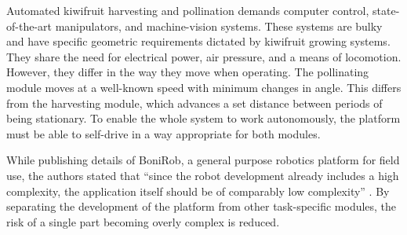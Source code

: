 \documentclass[preprint,authoryear,12pt]{elsarticle}
\begin{document}
    Automated kiwifruit harvesting and pollination demands computer control, state-of-the-art manipulators, and machine-vision systems.
    These systems are bulky and have specific geometric requirements dictated by kiwifruit growing systems.
    They share the need for electrical power, air pressure, and a means of locomotion.
    However, they differ in the way they move when operating.
    The pollinating module moves at a well-known speed with minimum changes in angle.
    This differs from the harvesting module, which advances a set distance between periods of being stationary.
    To enable the whole system to work autonomously, the platform must be able to self-drive in a way appropriate for both modules.

    While publishing details of BoniRob, a general purpose robotics platform for field use, the authors stated that ``since the robot development already includes a high complexity, the application itself should be of comparably low complexity'' \citep{Ruckelshausen2009}.
    By separating the development of the platform from other task-specific modules, the risk of a single part becoming overly complex is reduced.
\end{document}
